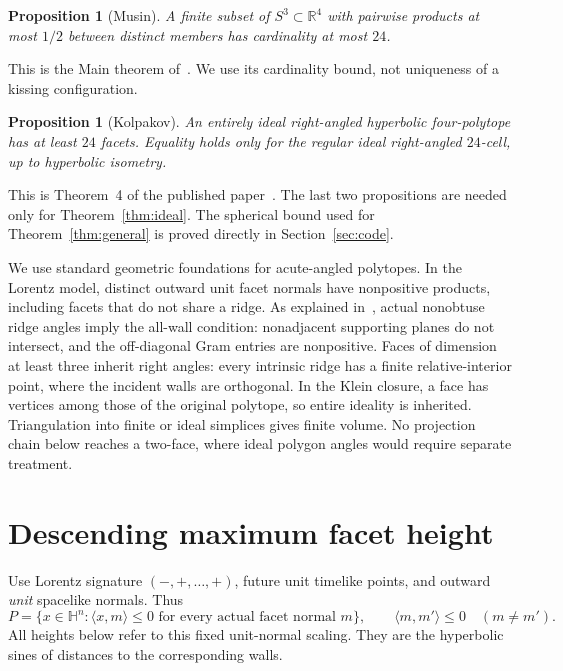 \documentclass[11pt]{article}
\newtheorem{proposition}[theorem]{Proposition}
\theoremstyle{remark}
\newcommand{\HH}{\mathbb H}
\newcommand{\RR}{\mathbb R}
\newcommand{\ip}[2]{\langle #1,#2\rangle}
\begin{document}
\begin{proposition}[Musin]\label{prop:musin}
A finite subset of $S^3\subset\RR^4$ with pairwise products at most
$1/2$ between distinct members has cardinality at most $24$.
\end{proposition}

This is the Main theorem of~\cite[p.~4]{Musin}. We use its
cardinality bound, not uniqueness of a kissing configuration.

\begin{proposition}[Kolpakov]\label{prop:24}
An entirely ideal right-angled hyperbolic four-polytope has at least
$24$ facets. Equality holds only for the regular ideal right-angled
$24$-cell, up to hyperbolic isometry.
\end{proposition}

This is Theorem~4 of the published paper~\cite[p.~1945]{Kolpakov}.
The last two propositions are needed only for Theorem~\ref{thm:ideal}.
The spherical bound used for Theorem~\ref{thm:general} is proved
directly in Section~\ref{sec:code}.

We use standard geometric foundations for acute-angled polytopes.
In the Lorentz model, distinct outward unit facet normals have
nonpositive products, including facets that do not share a ridge.
As explained in~\cite[p.~42, \S2.1]{Vinberg}, actual nonobtuse ridge
angles imply the all-wall condition: nonadjacent supporting planes
do not intersect, and the off-diagonal Gram entries are nonpositive.
Faces of dimension at least three inherit right angles: every
intrinsic ridge has a finite relative-interior point, where the
incident walls are orthogonal. In the Klein closure, a face has
vertices among those of the original polytope, so entire ideality is
inherited. Triangulation into finite or ideal simplices gives finite
volume. No projection chain below reaches a two-face, where ideal
polygon angles would require separate treatment.

\section{Descending maximum facet height}\label{sec:descent}

Use Lorentz signature $(-,+,\ldots,+)$, future unit timelike points,
and outward \emph{unit} spacelike normals. Thus
\[
 P=\{x\in\HH^n:\ip{x}{m}\le0\text{ for every actual facet normal }m\},
 \qquad \ip{m}{m'}\le0\quad(m\ne m').
\]
All heights below refer to this fixed unit-normal scaling. They are
the hyperbolic sines of distances to the corresponding walls.
\end{document}
